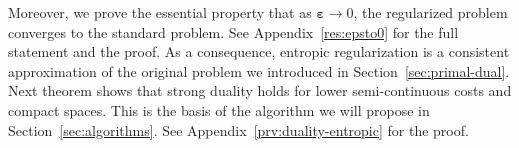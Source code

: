 Moreover, we prove the essential property that as $\bm{\varepsilon}\to 0$, the regularized problem converges to the standard problem. See Appendix~\ref{res:epsto0} for the full statement and the proof. As a consequence, entropic regularization is a consistent approximation of the original problem we introduced in Section~\ref{sec:primal-dual}.
Next theorem shows that strong duality holds for lower semi-continuous costs and compact spaces. This is the basis of the algorithm we will propose in Section~\ref{sec:algorithms}. See Appendix~\ref{prv:duality-entropic} for the proof.
